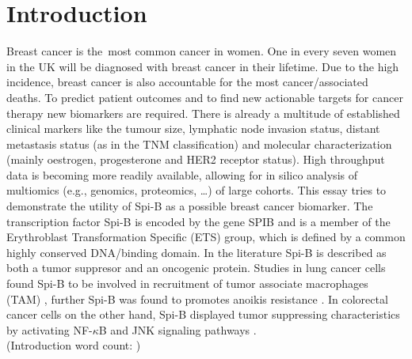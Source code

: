 \section{Introduction}
\countem

Breast cancer is the\ most common cancer in women.
One in every seven women in the UK will be diagnosed with breast cancer in their lifetime. 
Due to the high incidence, breast cancer is also accountable for the most cancer\-/associated deaths.
To predict patient outcomes and to find new actionable targets for cancer therapy new biomarkers are required.
There is already a multitude of established clinical markers like the tumour size, lymphatic node invasion status, distant metastasis status (as in the TNM classification) and molecular characterization (mainly oestrogen, progesterone and HER2 receptor status).
High throughput data is becoming more readily available, allowing for in silico analysis of multiomics (e.g., genomics, proteomics, \ldots) of large cohorts.
This essay tries to demonstrate the utility of Spi-B as a possible breast cancer biomarker.
The transcription factor Spi-B is encoded by the gene SPIB and is a member of the Erythroblast Transformation Specific (ETS) group, which is defined by a common highly conserved DNA\-/binding domain.
In the literature Spi-B is described as both a tumor suppresor and an oncogenic protein.
Studies in lung cancer cells found Spi-B to be involved in recruitment of tumor associate macrophages (TAM) \cite{Huang2021}, further Spi-B was found to promotes anoikis resistance \cite{Zhang2020}.
In colorectal cancer cells on the other hand, Spi-B displayed tumor suppressing characteristics by activating NF-$\kappa$B and JNK signaling pathways \cite{Zhao2021}.
\\
\endcountem 
(Introduction word count: \thewordcount{})